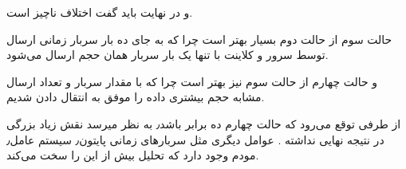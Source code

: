 \documentclass[11pt]{article}
\begin{document}
\begin{enumerate}[leftmargin=0.26in, font=\huge\bfseries]
و در نهایت باید گفت اختلاف ناچیز است.

حالت سوم 
از حالت دوم بسیار بهتر است چرا که به جای ده بار سربار زمانی ارسال 
توسط سرور و کلاینت با تنها یک بار سربار همان حجم ارسال می‌شود.
 
و حالت چهارم از حالت سوم نیز بهتر است چرا که با مقدار سربار و تعداد ارسال مشابه حجم بیشتری داده را موفق به انتقال دادن شدیم.   


از طرفی توقع می‌رود که 
حالت چهارم ده برابر باشد٫ به نظر میرسد نقش زیاد بزرگی در نتیجه نهایی نداشته .
عوامل دیگری مثل سربارهای زمانی پایتون٫ سیستم عامل٫ مودم وجود دارد که تحلیل بیش از این را سخت می‌کند.

	\end{enumerate}
	
	
\end{document}
